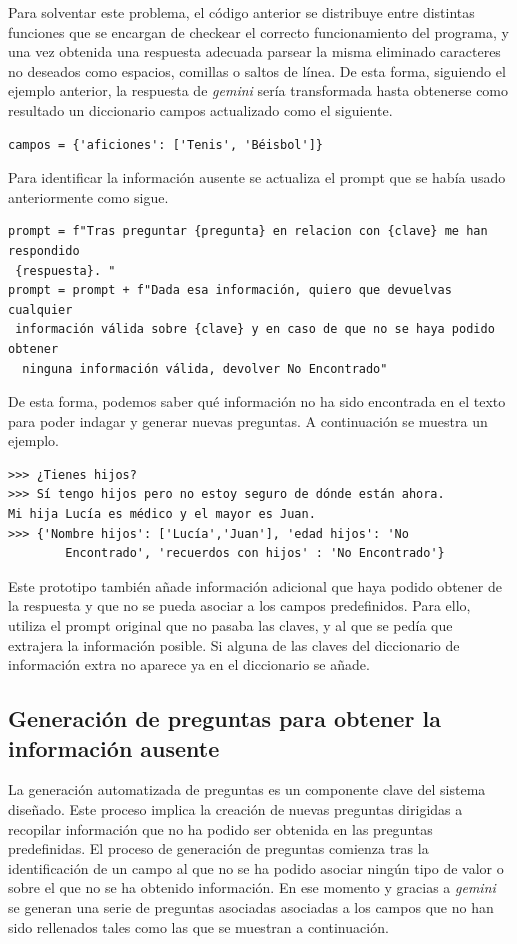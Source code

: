 Para solventar este problema, el código anterior se distribuye entre distintas funciones que se encargan de checkear el correcto funcionamiento del programa, y una vez obtenida una respuesta adecuada parsear la misma eliminado caracteres no deseados como espacios, comillas o saltos de línea. De esta forma, siguiendo el ejemplo anterior, la respuesta de \textit{gemini} sería transformada hasta obtenerse como resultado un diccionario campos actualizado como el siguiente.  
\begin{verbatim}
campos = {'aficiones': ['Tenis', 'Béisbol']}
\end{verbatim}

Para identificar la información ausente se actualiza el prompt que se había usado anteriormente como sigue.  

\begin{verbatim}
prompt = f"Tras preguntar {pregunta} en relacion con {clave} me han respondido
 {respuesta}. "
prompt = prompt + f"Dada esa información, quiero que devuelvas cualquier
 información válida sobre {clave} y en caso de que no se haya podido obtener
  ninguna información válida, devolver No Encontrado"
\end{verbatim}

De esta forma, podemos saber qué información no ha sido encontrada en el texto para poder indagar y generar nuevas preguntas. A continuación se muestra un ejemplo.

\begin{verbatim}
>>>	¿Tienes hijos?
>>> Sí tengo hijos pero no estoy seguro de dónde están ahora.
Mi hija Lucía es médico y el mayor es Juan.
>>> {'Nombre hijos': ['Lucía','Juan'], 'edad hijos': 'No
		Encontrado', 'recuerdos con hijos' : 'No Encontrado'}
\end{verbatim}

Este prototipo también añade información adicional que haya podido obtener de la respuesta y que no se pueda asociar a los campos predefinidos. Para ello, utiliza el prompt original que no pasaba las claves, y al que se pedía que extrajera la información posible. Si alguna de las claves del diccionario de información extra no aparece ya en el diccionario se añade. 

\subsection{Generación de preguntas para obtener la información ausente}
\label{generacionpreguntas}
La generación automatizada de preguntas es un componente clave del sistema diseñado. Este proceso implica la creación de nuevas preguntas dirigidas a recopilar información que no ha podido ser obtenida en las preguntas predefinidas. El proceso de generación de preguntas comienza tras la identificación de un campo al que no se ha podido asociar ningún tipo de valor o sobre el que no se ha obtenido información. En ese momento y gracias a \textit{gemini} se generan una serie de preguntas asociadas asociadas a los campos que no han sido rellenados tales como las que se muestran a continuación.  

